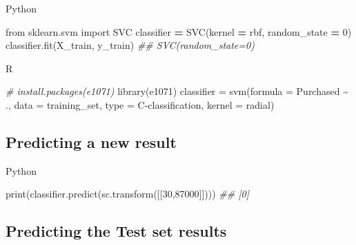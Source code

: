 \documentclass[
]{book}
\newenvironment{Shaded}{\begin{snugshade}}{\end{snugshade}}
\newcommand{\AttributeTok}[1]{\textcolor[rgb]{0.77,0.63,0.00}{#1}}
\newcommand{\BuiltInTok}[1]{#1}
\newcommand{\CommentTok}[1]{\textcolor[rgb]{0.56,0.35,0.01}{\textit{#1}}}
\newcommand{\DecValTok}[1]{\textcolor[rgb]{0.00,0.00,0.81}{#1}}
\newcommand{\FunctionTok}[1]{\textcolor[rgb]{0.00,0.00,0.00}{#1}}
\newcommand{\ImportTok}[1]{#1}
\newcommand{\NormalTok}[1]{#1}
\newcommand{\OperatorTok}[1]{\textcolor[rgb]{0.81,0.36,0.00}{\textbf{#1}}}
\newcommand{\OtherTok}[1]{\textcolor[rgb]{0.56,0.35,0.01}{#1}}
\newcommand{\SpecialCharTok}[1]{\textcolor[rgb]{0.00,0.00,0.00}{#1}}
\newcommand{\StringTok}[1]{\textcolor[rgb]{0.31,0.60,0.02}{#1}}
\theoremstyle{definition}
\theoremstyle{definition}
\theoremstyle{definition}
\theoremstyle{definition}
\theoremstyle{remark}
\begin{document}
Python

\begin{Shaded}
\begin{Highlighting}[]
\ImportTok{from}\NormalTok{ sklearn.svm }\ImportTok{import}\NormalTok{ SVC}
\NormalTok{classifier }\OperatorTok{=}\NormalTok{ SVC(kernel }\OperatorTok{=} \StringTok{\textquotesingle{}rbf\textquotesingle{}}\NormalTok{, random\_state }\OperatorTok{=} \DecValTok{0}\NormalTok{)}
\NormalTok{classifier.fit(X\_train, y\_train)}
\CommentTok{\#\# SVC(random\_state=0)}
\end{Highlighting}
\end{Shaded}

R

\begin{Shaded}
\begin{Highlighting}[]
\CommentTok{\# install.packages(\textquotesingle{}e1071\textquotesingle{})}
\FunctionTok{library}\NormalTok{(e1071)}
\NormalTok{classifier }\OtherTok{=} \FunctionTok{svm}\NormalTok{(}\AttributeTok{formula =}\NormalTok{ Purchased }\SpecialCharTok{\textasciitilde{}}\NormalTok{ .,}
                 \AttributeTok{data =}\NormalTok{ training\_set,}
                 \AttributeTok{type =} \StringTok{\textquotesingle{}C{-}classification\textquotesingle{}}\NormalTok{,}
                 \AttributeTok{kernel =} \StringTok{\textquotesingle{}radial\textquotesingle{}}\NormalTok{)}
\end{Highlighting}
\end{Shaded}

\hypertarget{predicting-a-new-result-6}{%
\subsection{Predicting a new result}\label{predicting-a-new-result-6}}

Python

\begin{Shaded}
\begin{Highlighting}[]
\BuiltInTok{print}\NormalTok{(classifier.predict(sc.transform([[}\DecValTok{30}\NormalTok{,}\DecValTok{87000}\NormalTok{]])))}
\CommentTok{\#\# [0]}
\end{Highlighting}
\end{Shaded}

\hypertarget{predicting-the-test-set-results-5}{%
\subsection{Predicting the Test set results}\label{predicting-the-test-set-results-5}}
\end{document}
